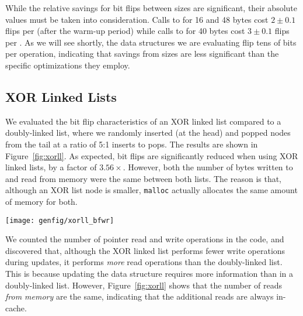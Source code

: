 While the relative savings for bit flips between \malloc sizes are significant,
their absolute values must be taken into consideration. Calls to \malloc for 16
and 48
bytes cost $2\pm0.1$ flips per \malloc (after the warm-up period) while calls to
\malloc for 40 bytes cost $3 \pm 0.1$ flips per \malloc.
As we will see shortly, the data structures we are evaluating flip tens of bits
per operation, indicating that savings from \malloc sizes are less significant
than the specific optimizations they employ.





\subsection{XOR Linked Lists}


We evaluated the bit flip characteristics of an XOR linked list compared to a
doubly-linked list, where we randomly inserted (at the head) and popped nodes from the tail
at a ratio of 5:1 inserts to pops.
The results are shown in
Figure~\ref{fig:xorll}. As expected, bit flips are significantly reduced when
using XOR linked lists, by a factor of $3.56\times$. However, both the number of bytes written to
and read from memory were the same between both lists. The reason is that,
although an XOR list node is smaller, \texttt{malloc} actually allocates the
same amount of memory for both.

\begin{SCfigure}
	\centering
	\texttt{[image: genfig/xorll\_bfwr]}
	\caption[XOR versus standard linked list characteristics]{Memory characteristics of of XOR linked lists compared to Doubly-Linked
		Lists.}
	\label{fig:xorll}
\end{SCfigure}


We counted the number of pointer read and write operations in the code,
and discovered that, although the XOR linked list performs fewer write
operations during updates, it performs \textit{more} read operations than the
doubly-linked list. This is because updating the data structure requires more
information than in a doubly-linked list. However, Figure~\ref{fig:xorll} shows
that the number of reads \textit{from memory} are the same, indicating that the
additional reads are always in-cache.

